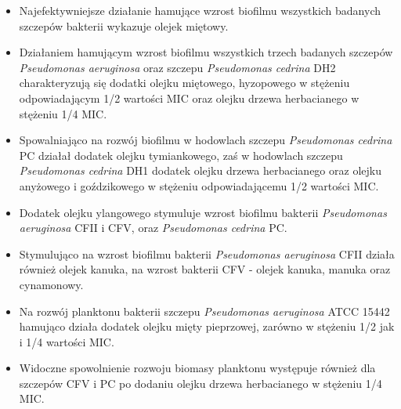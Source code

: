\documentclass[11pt,a4paper]{report}
\begin{document}
\begin{itemize}
\item Najefektywniejsze działanie hamujące wzrost biofilmu wszystkich badanych szczepów bakterii wykazuje olejek miętowy.

\item Działaniem hamującym wzrost biofilmu wszystkich trzech badanych szczepów \textit{Pseudomonas aeruginosa} oraz szczepu \textit{Pseudomonas cedrina} DH2 charakteryzują się dodatki olejku miętowego, hyzopowego w stężeniu odpowiadającym 1/2 wartości MIC oraz olejku drzewa herbacianego w stężeniu 1/4 MIC.

\item Spowalniająco na rozwój biofilmu w hodowlach szczepu \textit{Pseudomonas cedrina} PC działał dodatek olejku tymiankowego, zaś w hodowlach szczepu \textit{Pseudomonas cedrina} DH1 dodatek olejku drzewa herbacianego oraz olejku anyżowego i goździkowego w stężeniu odpowiadającemu 1/2 wartości MIC.

\item Dodatek olejku ylangowego stymuluje wzrost biofilmu bakterii \textit{Pseudomonas aeruginosa} CFII i CFV, oraz \textit{Pseudomonas cedrina} PC.

\item Stymulująco na wzrost biofilmu bakterii \textit{Pseudomonas aeruginosa} CFII działa również olejek kanuka, na wzrost bakterii CFV - olejek kanuka, manuka oraz cynamonowy.

\item Na rozwój planktonu bakterii szczepu \textit{Pseudomonas aeruginosa} ATCC 15442 hamująco działa dodatek olejku mięty pieprzowej, zarówno w stężeniu 1/2 jak i 1/4 wartości MIC.

\item Widoczne spowolnienie rozwoju biomasy planktonu występuje również dla szczepów CFV i PC po dodaniu olejku drzewa herbacianego w stężeniu 1/4 MIC.

\end{itemize}


\clearpage




\listoffigures
\listoftables
\end{document}
